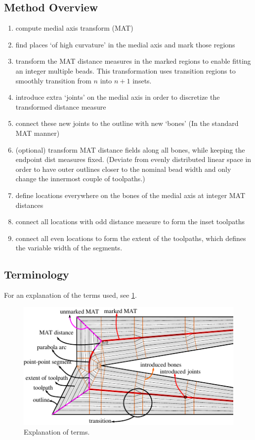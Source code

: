 \subsection{Method Overview}
\begin{enumerate}
\item compute medial axis transform (MAT)
\item find places `of high curvature' in the medial axis and mark those regions
\item transform the MAT distance measures in the marked regions to enable fitting an integer multiple beads.
		This transformation uses transition regions to smoothly transition from $n$ into $n+1$ insets.
\item introduce extra `joints' on the medial axis in order to discretize the transformed distance measure
\item connect these new joints to the outline with new `bones' (In the standard MAT manner)
\item (optional) transform MAT distance fields along all bones, while keeping the endpoint dist measures fixed. (Deviate from evenly distributed linear space in order to have outer outlines closer to the nominal bead width and only change the innermost couple of toolpaths.)
\item define locations everywhere on the bones of the medial axis at integer MAT distances
\item connect all locations with odd distance measure to form the inset toolpaths
\item connect all even locations to form the extent of the toolpaths, which defines the variable width of the segments.
\end{enumerate}

\subsection{Terminology}
For an explanation of the terms used, see \cref{legend}.

\begin{figure}
\includegraphics[width=\columnwidth]{sources/method/legend_double_wedge_example.pdf}
\caption{Explanation of terms.}
\label{legend}
\end{figure}



